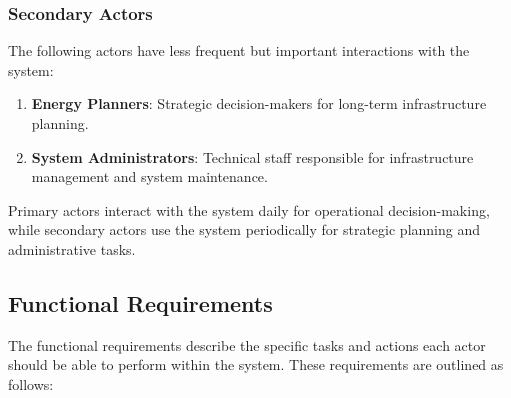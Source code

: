 \subsubsection{Secondary Actors}

The following actors have less frequent but important interactions with the system:

\begin{enumerate}
    \item \textbf{Energy Planners}: Strategic decision-makers for long-term infrastructure planning.
    \item \textbf{System Administrators}: Technical staff responsible for infrastructure management and system maintenance.
\end{enumerate}

Primary actors interact with the system daily for operational decision-making, while secondary actors use the system periodically for strategic planning and administrative tasks.

\subsection{Functional Requirements}
\label{subsec:func_req}

The functional requirements describe the specific tasks and actions each
actor should be able to perform within the system. These requirements are
outlined as follows:

